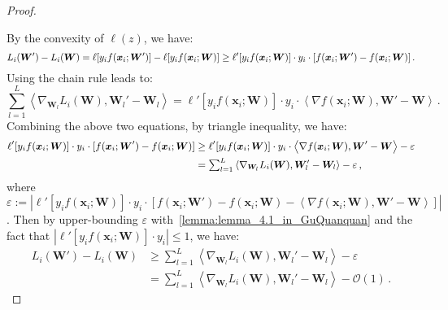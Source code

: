 \documentclass[nohyperref]{article}
\theoremstyle{plain}
\theoremstyle{definition}
\theoremstyle{remark}
\begin{document}
\begin{proof}
\label{proof:lemma_4.2_in_GuQuanquan}

By the convexity of $\ell(z)$, we have:
\begin{equation*}
\small
    L_i({\bm{W}}') - L_i(\bm{W}) =  \ell[y_i  f(\bm{x}_i;{\bm{W}}') ] - \ell[ y_i f(\bm{x}_i;\bm{W}) ] \geq  \ell'[ y_i f(\bm{x}_i;\bm{W})] \cdot y_i\cdot [ f(\bm{x}_i;{\bm{W}}') - f(\bm{x}_i;\bm{W}) ]\,.
\end{equation*}
Using the chain rule leads to:
\begin{equation*}
\sum_{l=1}^L \left \langle  \nabla_{\bm{W}_l} L_i(\bm{W}), \bm{W}_l' - \bm{W}_l \right \rangle  = \ell'[ y_i f(\bm{x}_i;\bm{W})] \cdot y_i\cdot \left \langle  \nabla f(\bm{x}_i;\bm{W}) , {\bm{W}}' - \bm{W} \right \rangle\,.
\end{equation*}
Combining the above two equations, by triangle inequality, we have:
\begin{equation*}
\small
\begin{split}
        \ell'[ y_i f(\bm{x}_i;\bm{W})]\cdot y_i\cdot[ f(\bm{x}_i;{\bm{W}}') - f(\bm{x}_i;\bm{W}) ] & \geq \ell'[ y_i f(\bm{x}_i;\bm{W})] \cdot y_i\cdot  \left \langle  \nabla f(\bm{x}_i;\bm{W}) , {\bm{W}}' - \bm{W}  \right \rangle   - \varepsilon \\
    & = \textstyle \sum_{l=1}^L  \left \langle  \nabla_{\bm{W}_l} L_i(\bm{W}), \bm{W}_l' - \bm{W}_l  \right \rangle  - \varepsilon\,,
\end{split}
\end{equation*}
where $\varepsilon := | \ell'[ y_i f(\bm{x}_i;\bm{W})] \cdot y_i\cdot [ f(\bm{x}_i;{\bm{W}}') - f(\bm{x}_i;\bm{W})  - \left \langle \nabla f(\bm{x}_i;\bm{W}) , {\bm{W}}' - \bm{W} \right \rangle ] |$.  Then by upper-bounding $\varepsilon$ with~\cref{lemma:lemma_4.1_in_GuQuanquan} and the fact that $| \ell'[ y_i f(\bm{x}_i;\bm{W})] \cdot y_i | \leq 1$, we have:
\begin{equation*}
\begin{split}
    L_i({\bm{W}}') - L_i(\bm{W}) & \geq \sum_{l=1}^L \left \langle \nabla_{\bm{W}_l} L_i(\bm{W}), \bm{W}_l' - \bm{W}_l \right \rangle - \varepsilon\\
     & = \sum_{l=1}^L \left \langle \nabla_{\bm{W}_l} L_i(\bm{W}), \bm{W}_l' - \bm{W}_l \right \rangle - \mathcal{O}(1)\,.
\end{split}
\end{equation*}
\end{proof}
\end{document}
